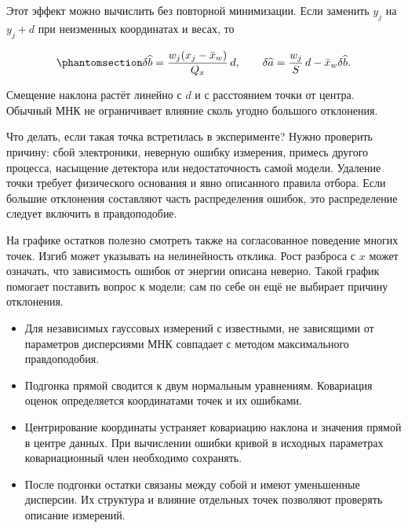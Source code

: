 \documentclass[
  russian,
  11pt,
  a4paper,
  open=any]{scrbook}
\providecommand{\tightlist}{%
  \setlength{\itemsep}{0pt}\setlength{\parskip}{0pt}}
\begin{document}
Этот эффект можно вычислить без повторной минимизации. Если заменить
\(y_j\) на \(y_j+d\) при неизменных координатах и весах, то

\begin{equation}\protect\phantomsection\label{eq-ch11-single-point-shift}{
\delta\widehat b=\frac{w_j(x_j-\bar x_w)}{Q_x}\,d,
\qquad
\delta\widehat a=\frac{w_j}{S}\,d-\bar x_w\delta\widehat b.
}\end{equation}

Смещение наклона растёт линейно с \(d\) и с расстоянием точки от центра.
Обычный МНК не ограничивает влияние сколь угодно большого отклонения.

Что делать, если такая точка встретилась в эксперименте? Нужно проверить
причину: сбой электроники, неверную ошибку измерения, примесь другого
процесса, насыщение детектора или недостаточность самой модели. Удаление
точки требует физического основания и явно описанного правила отбора.
Если большие отклонения составляют часть распределения ошибок, это
распределение следует включить в правдоподобие.

На графике остатков полезно смотреть также на согласованное поведение
многих точек. Изгиб может указывать на нелинейность отклика. Рост
разброса с \(x\) может означать, что зависимость ошибок от энергии
описана неверно. Такой график помогает поставить вопрос к модели; сам по
себе он ещё не выбирает причину отклонения.

\begin{bookchaptersummary}

\begin{itemize}
\tightlist
\item
  Для независимых гауссовых измерений с известными, не зависящими от
  параметров дисперсиями МНК совпадает с методом максимального
  правдоподобия.
\item
  Подгонка прямой сводится к двум нормальным уравнениям. Ковариация
  оценок определяется координатами точек и их ошибками.
\item
  Центрирование координаты устраняет ковариацию наклона и значения
  прямой в центре данных. При вычислении ошибки кривой в исходных
  параметрах ковариационный член необходимо сохранять.
\item
  После подгонки остатки связаны между собой и имеют уменьшенные
  дисперсии. Их структура и влияние отдельных точек позволяют проверять
  описание измерений.
\end{itemize}

\end{bookchaptersummary}
\end{document}
